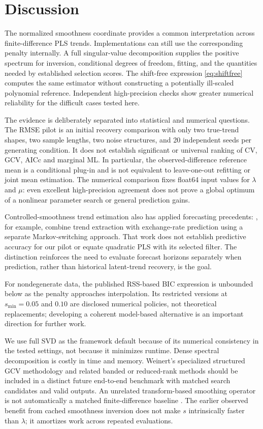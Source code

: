 \section{Discussion}\label{sec:discussion}
The normalized smoothness coordinate provides a common interpretation across finite-difference PLS trends. Implementations can still use the corresponding penalty internally. A full singular-value decomposition supplies the positive spectrum for inversion, conditional degrees of freedom, fitting, and the quantities needed by established selection scores. The shift-free expression \eqref{eq:shiftfree} computes the same estimator without constructing a potentially ill-scaled polynomial reference. Independent high-precision checks show greater numerical reliability for the difficult cases tested here.

The evidence is deliberately separated into statistical and numerical questions. The RMSE pilot is an initial recovery comparison with only two true-trend shapes, two sample lengths, two noise structures, and 20 independent seeds per generating condition. It does not establish significant or universal ranking of CV, GCV, AICc and marginal ML. In particular, the observed-difference reference mean is a conditional plug-in and is not equivalent to leave-one-out refitting or joint mean estimation. The numerical comparison fixes float64 input values for $\lambda$ and $\mu$: even excellent high-precision agreement does not prove a global optimum of a nonlinear parameter search or general prediction gains.

Controlled-smoothness trend estimation also has applied forecasting precedents: \citet{islaszumaya2025}, for example, combine trend extraction with exchange-rate prediction using a separate Markov-switching approach. That work does not establish predictive accuracy for our pilot or equate quadratic PLS with its selected filter. The distinction reinforces the need to evaluate forecast horizons separately when prediction, rather than historical latent-trend recovery, is the goal.

For nondegenerate data, the published RSS-based BIC expression is unbounded below as the penalty approaches interpolation. Its restricted versions at $s_{\min}=0.05$ and $0.10$ are disclosed numerical policies, not theoretical replacements; developing a coherent model-based alternative is an important direction for further work.

We use full SVD as the framework default because of its numerical consistency in the tested settings, not because it minimizes runtime. Dense spectral decomposition is costly in time and memory. Weinert's specialized structured GCV methodology \citep{weinert2007} and related banded or reduced-rank methods \citep{biessy2026} should be included in a distinct future end-to-end benchmark with matched search candidates and valid outputs. An unrelated transform-based smoothing operator is not automatically a matched finite-difference baseline \citep{garcia2010}. The earlier observed benefit from cached smoothness inversion does not make $s$ intrinsically faster than $\lambda$; it amortizes work across repeated evaluations.

